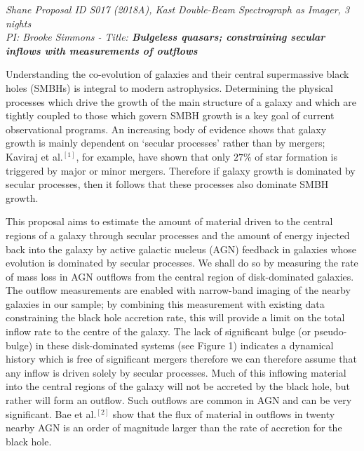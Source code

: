 \documentclass[12pt]{article}
\begin{document}
\noindent \emph{Shane Proposal ID S017 (2018A), Kast Double-Beam Spectrograph as Imager, 3 nights} \\
\noindent \emph{PI: Brooke Simmons - Title: {\bf Bulgeless quasars; constraining secular inflows with measurements of outflows}} 
\vspace{0.5em}

\vspace{0.25em}

Understanding the co-evolution of galaxies and their central supermassive black holes (SMBHs) is integral to modern astrophysics. Determining the physical processes which drive the growth of the main structure of a galaxy and which are tightly coupled to those which govern SMBH growth is a key goal of current observational programs. An increasing body of evidence shows that galaxy growth is mainly dependent on `secular processes' rather than by mergers; Kaviraj et al.$^{[1]}$, for example, have shown that only $27\%$ of star formation is triggered by major or minor mergers. Therefore if galaxy growth is dominated by secular processes, then it follows that these processes also dominate SMBH growth.
\vspace{0.25em}

This proposal aims to estimate the amount of material driven to the central regions of a galaxy through secular processes and the amount of energy injected back into the galaxy by active galactic nucleus (AGN) feedback in galaxies whose evolution is dominated by secular processes. We shall do so by measuring the rate of mass loss in AGN outflows from the central region of disk-dominated galaxies. The outflow measurements are enabled with narrow-band imaging of the nearby galaxies in our sample; by combining this measurement with existing data constraining the black hole accretion rate, this will provide a limit on the total inflow rate to the centre of the galaxy. The lack of significant bulge (or pseudo-bulge) in these disk-dominated systems (see Figure 1) indicates a dynamical history which is free of significant mergers therefore we can therefore assume that any inflow is driven solely by secular processes. Much of this inflowing material into the central regions of the galaxy will not be accreted by the black hole, but rather will form an outflow. Such outflows are common in AGN and can be very significant. Bae et al.$^{[2]}$ show that the flux of material in outflows in twenty nearby AGN is an order of magnitude larger than the rate of accretion for the black hole.
\vspace{0.25em}
\end{document}
